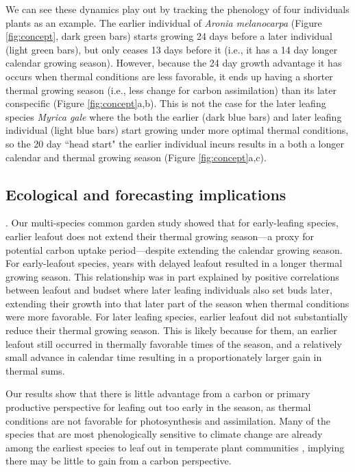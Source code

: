 \documentclass{article}[12pt]
\begin{document}
We can see these dynamics play out by tracking the phenology of four individuals plants as an example. The earlier individual of \emph{Aronia melanocarpa} (Figure \ref{fig:concept}, dark green bars) starts growing 24 days before a later individual (light green bars), but only ceases 13 days before it (i.e., it has a 14 day longer calendar growing season). However, because the 24 day growth advantage it has occurs when thermal conditions are less favorable, it ends up having a shorter thermal growing season (i.e., less change for carbon assimilation) than its later conspecific (Figure \ref{fig:concept}a,b). This is not the case for the later leafing species \emph{Myrica gale} where the both the earlier (dark blue bars) and later leafing individual (light blue bars) start growing under more optimal thermal conditions, so the 20 day ``head start" the earlier individual incurs results in a both a longer calendar and thermal growing season (Figure \ref{fig:concept}a,c). 


\subsection{Ecological and forecasting implications}. 
Our multi-species common garden study showed that for early-leafing species, earlier leafout does not extend their thermal growing season---a proxy for potential carbon uptake period---despite extending the calendar growing season. For early-leafout species, years with delayed leafout resulted in a longer thermal growing season. This relationship was in part explained by positive correlations between leafout and budset where later leafing individuals also set buds later, extending their growth into that later part of the season when thermal conditions were more favorable.  For later leafing species, earlier leafout did not substantially reduce their thermal growing season. This is likely because for them, an earlier leafout still occurred in thermally favorable times of the season, and a relatively small advance in calendar time resulting in a proportionately larger gain in thermal sums.

Our results show that there is little advantage from a carbon or primary productive perspective for leafing out too early in the season, as thermal conditions are not favorable for photosynthesis and assimilation. Many of the species that are most phenologically sensitive to climate change are already among the earliest species to leaf out in temperate plant communities \citep{Shen2014,Geng2020}, implying there may be little to gain from a carbon perspective.
\end{document}
